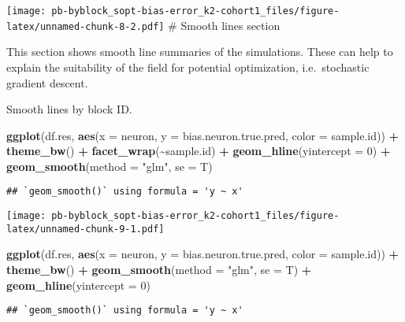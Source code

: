 \documentclass[
]{article}
\newenvironment{Shaded}{\begin{snugshade}}{\end{snugshade}}
\newcommand{\AttributeTok}[1]{\textcolor[rgb]{0.13,0.29,0.53}{#1}}
\newcommand{\DecValTok}[1]{\textcolor[rgb]{0.00,0.00,0.81}{#1}}
\newcommand{\FunctionTok}[1]{\textcolor[rgb]{0.13,0.29,0.53}{\textbf{#1}}}
\newcommand{\NormalTok}[1]{#1}
\newcommand{\SpecialCharTok}[1]{\textcolor[rgb]{0.81,0.36,0.00}{\textbf{#1}}}
\newcommand{\StringTok}[1]{\textcolor[rgb]{0.31,0.60,0.02}{#1}}
\begin{document}
\texttt{[image: pb-byblock\_sopt-bias-error\_k2-cohort1\_files/figure-latex/unnamed-chunk-8-2.pdf]}
\# Smooth lines section

This section shows smooth line summaries of the simulations. These can
help to explain the suitability of the field for potential optimization,
i.e.~stochastic gradient descent.

Smooth lines by block ID.

\begin{Shaded}
\begin{Highlighting}[]
\FunctionTok{ggplot}\NormalTok{(df.res, }\FunctionTok{aes}\NormalTok{(}\AttributeTok{x =}\NormalTok{ neuron, }\AttributeTok{y =}\NormalTok{ bias.neuron.true.pred, }\AttributeTok{color =}\NormalTok{ sample.id)) }\SpecialCharTok{+} 
  \FunctionTok{theme\_bw}\NormalTok{() }\SpecialCharTok{+} \FunctionTok{facet\_wrap}\NormalTok{(}\SpecialCharTok{\textasciitilde{}}\NormalTok{sample.id) }\SpecialCharTok{+} \FunctionTok{geom\_hline}\NormalTok{(}\AttributeTok{yintercept =} \DecValTok{0}\NormalTok{) }\SpecialCharTok{+}
  \FunctionTok{geom\_smooth}\NormalTok{(}\AttributeTok{method =} \StringTok{"glm"}\NormalTok{, }\AttributeTok{se =}\NormalTok{ T)}
\end{Highlighting}
\end{Shaded}

\begin{verbatim}
## `geom_smooth()` using formula = 'y ~ x'
\end{verbatim}

\texttt{[image: pb-byblock\_sopt-bias-error\_k2-cohort1\_files/figure-latex/unnamed-chunk-9-1.pdf]}

\begin{Shaded}
\begin{Highlighting}[]
\FunctionTok{ggplot}\NormalTok{(df.res, }\FunctionTok{aes}\NormalTok{(}\AttributeTok{x =}\NormalTok{ neuron, }\AttributeTok{y =}\NormalTok{ bias.neuron.true.pred, }\AttributeTok{color =}\NormalTok{ sample.id)) }\SpecialCharTok{+} 
  \FunctionTok{theme\_bw}\NormalTok{() }\SpecialCharTok{+} \FunctionTok{geom\_smooth}\NormalTok{(}\AttributeTok{method =} \StringTok{"glm"}\NormalTok{, }\AttributeTok{se =}\NormalTok{ T) }\SpecialCharTok{+} \FunctionTok{geom\_hline}\NormalTok{(}\AttributeTok{yintercept =} \DecValTok{0}\NormalTok{)}
\end{Highlighting}
\end{Shaded}

\begin{verbatim}
## `geom_smooth()` using formula = 'y ~ x'
\end{verbatim}
\end{document}
